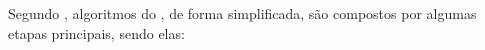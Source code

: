 Segundo , algoritmos do \DEM{}, de forma simplificada, são compostos por algumas etapas principais, sendo elas:


